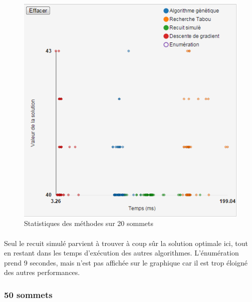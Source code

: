 \documentclass[12pt]{article}
\begin{document}
\begin{figure}[H]
	\begin{center}
	\includegraphics[scale=0.5]{pictures/results/20sommets.png}
	\end{center}
	\caption{Statistiques des méthodes sur 20 sommets \label{fig:20nodeResult}}
\end{figure}
\paragraph{}Seul le recuit simulé parvient à trouver à coup sûr la solution optimale ici, tout en restant dans les temps d'exécution des autres algorithmes. L'énumération prend 9 secondes, mais n'est pas affichée sur le graphique car il est trop éloigné des autres performances.

\subsubsection{50 sommets}
\end{document}
